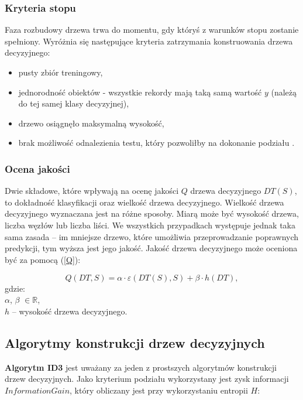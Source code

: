 \documentclass[12pt]{article}
\begin{document}
\subsubsection{Kryteria stopu}
Faza rozbudowy drzewa trwa do momentu, gdy któryś z warunków stopu zostanie spełniony.
Wyróżnia się następujące kryteria zatrzymania konstruowania drzewa decyzyjnego:
\begin{itemize}
    \item pusty zbiór treningowy,
    \item jednorodność obiektów - wszystkie rekordy mają taką samą wartość $y$ (należą do tej samej klasy decyzyjnej),
    \item drzewo osiągnęło maksymalną wysokość,
    \item brak możliwość odnalezienia testu, który pozwoliłby na dokonanie podziału \cite{data-mining-with-decision-trees}.
\end{itemize}

\subsubsection{Ocena jakości}
Dwie składowe, które wpływają na ocenę jakości $Q$ drzewa decyzyjnego $DT(S)$, to dokładność klasyfikacji oraz wielkość drzewa decyzyjnego.
Wielkość drzewa decyzyjnego wyznaczana jest na różne sposoby. Miarą może być wysokość drzewa, liczba węzłów
lub liczba liści. We wszystkich przypadkach występuje jednak taka sama zasada -- im mniejsze drzewo, które
umożliwia przeprowadzanie poprawnych predykcji, tym wyższa jest jego jakość. Jakość drzewa decyzyjnego może oceniona być za pomocą (\ref{Q}):


\begin{equation}\label{Q}
Q(DT, S) = \alpha \cdot  \hat{\varepsilon}(DT(S), S) + \beta \cdot h(DT),
\end{equation}
gdzie: \\
$\alpha$, $\beta$ $\in \mathbb{R}$,\\
$h$ -- wysokość drzewa decyzyjnego.

\subsection{Algorytmy konstrukcji drzew decyzyjnych}

\textbf{Algorytm ID3} jest uważany za jeden z prostszych algorytmów konstrukcji drzew decyzyjnych.
Jako kryterium podziału wykorzystany jest zysk informacji $InformationGain$, który obliczany jest
przy wykorzystaniu entropii $H$:
\end{document}
